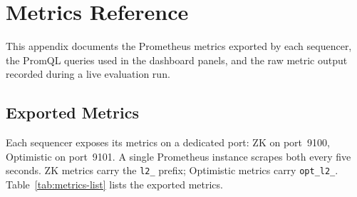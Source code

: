 \chapter{Metrics Reference}
\label{app:metrics}

This appendix documents the Prometheus metrics exported by each sequencer, the PromQL queries used in the dashboard panels, and the raw metric output recorded during a live evaluation run.

\section{Exported Metrics}

Each sequencer exposes its metrics on a dedicated port: ZK on port~9100, Optimistic on port~9101. A single Prometheus instance scrapes both every five seconds. ZK metrics carry the \texttt{l2\_} prefix; Optimistic metrics carry \texttt{opt\_l2\_}. Table~\ref{tab:metrics-list} lists the exported metrics.

